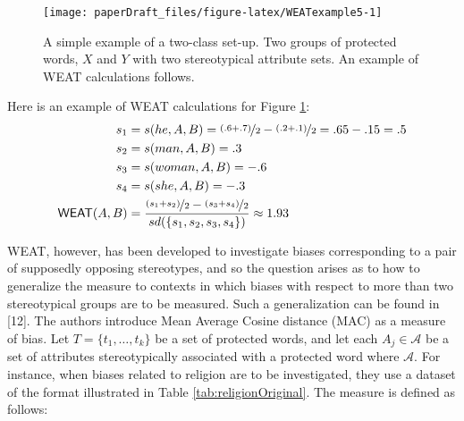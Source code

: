 \documentclass[
  12pt,
  dvipsnames,enabledeprecatedfontcommands]{scrartcl}
\begin{document}
\begin{figure}[H]

\begin{center}\texttt{[image: paperDraft\_files/figure-latex/WEATexample5-1]} \end{center}
\caption{A simple example of a two-class set-up. Two groups of protected words, $X$ and $Y$ with two stereotypical attribute sets. An example of \textsf{WEAT} calculations follows.}
\label{eq:WEATexample}
\end{figure}

\noindent Here is an example of \textsf{WEAT} calculations for Figure
\ref{eq:WEATexample}:
\begin{align*} s_1 & = s(he,A,B)  =  \nicefrac{(.6+.7)}{2}  - \nicefrac{(.2+.1)}{2} = .65-.15= .5 \\
s_2  & = s(man,A,B) = .3 \\
s_3  & = s(woman,A,B) = -.6\\
s_4 & = s(she, A, B) = -.3\\
\mathsf{WEAT}(A,B)  & = \frac{\nicefrac{(s_1+s_2)}{2} - \nicefrac{(s_3+s_4)}{2}}{sd(\{s_1,s_2,s_3,s_4\})} \approx 1.93
\end{align*}

\textsf{WEAT}, however, has been developed to investigate biases
corresponding to a pair of supposedly opposing stereotypes, and so the
question arises as to how to generalize the measure to contexts in which
biases with respect to more than two stereotypical groups are to be
measured. Such a generalization can be found in {[}12{]}. The authors
introduce Mean Average Cosine distance (\textsf{MAC}) as a measure of
bias. Let \(T = \{t_1, \dots, t_k\}\) be a set of protected words, and
let each \(A_j\in \mathcal{A}\) be a set of attributes stereotypically
associated with a protected word where \(\mathcal{A}\). For instance,
when biases related to religion are to be investigated, they use a
dataset of the format illustrated in Table \ref{tab:religionOriginal}.
The measure is defined as follows:
\end{document}
